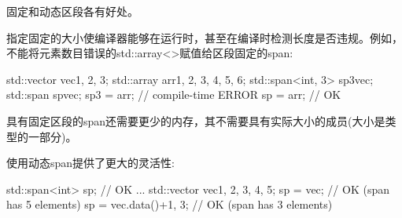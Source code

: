 
固定和动态区段各有好处。

指定固定的大小使编译器能够在运行时，甚至在编译时检测长度是否违规。例如，不能将元素数目错误的std::array<>赋值给区段固定的span:

\begin{cpp}
std::vector vec{1, 2, 3};
std::array arr{1, 2, 3, 4, 5, 6};
std::span<int, 3> sp3{vec};
std::span sp{vec};
sp3 = arr; // compile-time ERROR
sp = arr; // OK
\end{cpp}

具有固定区段的span还需要更少的内存，其不需要具有实际大小的成员(大小是类型的一部分)。

使用动态span提供了更大的灵活性:

\begin{cpp}
std::span<int> sp; // OK
...
std::vector vec{1, 2, 3, 4, 5};
sp = vec; // OK (span has 5 elements)
sp = {vec.data()+1, 3}; // OK (span has 3 elements)
\end{cpp}








